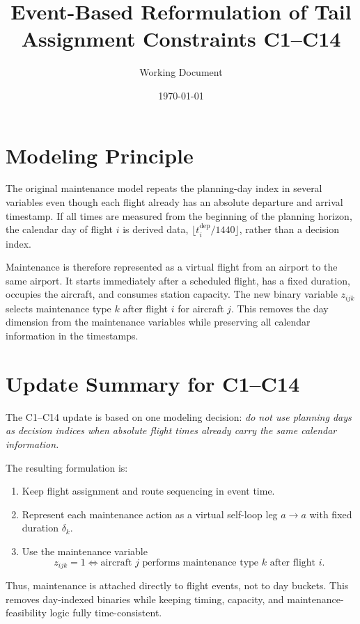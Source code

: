 \documentclass[11pt,a4paper]{article}
\title{Event-Based Reformulation of Tail Assignment Constraints C1--C14}
\author{Working Document}
\date{\today}
\begin{document}
\maketitle

\section{Modeling Principle}

The original maintenance model repeats the planning-day index in several
variables even though each flight already has an absolute departure and
arrival timestamp. If all times are measured from the beginning of the
planning horizon, the calendar day of flight $i$ is derived data,
$\lfloor t_i^{\mathrm{dep}}/1440\rfloor$, rather than a decision index.

Maintenance is therefore represented as a virtual flight from an airport to
the same airport. It starts immediately after a scheduled flight, has a fixed
duration, occupies the aircraft, and consumes station capacity. The new binary
variable $z_{ijk}$ selects maintenance type $k$ after flight $i$ for aircraft
$j$. This removes the day dimension from the maintenance variables while
preserving all calendar information in the timestamps.

\section{Update Summary for C1--C14}

The C1--C14 update is based on one modeling decision:
\emph{do not use planning days as decision indices when absolute flight times
already carry the same calendar information.}

The resulting formulation is:

\begin{enumerate}
  \item Keep flight assignment and route sequencing in event time.
  \item Represent each maintenance action as a virtual self-loop leg
  $a\rightarrow a$ with fixed duration $\delta_k$.
  \item Use the maintenance variable
  \[
    z_{ijk}=1
    \iff
    \text{aircraft }j\text{ performs maintenance type }k\text{ after flight }i.
  \]
\end{enumerate}

Thus, maintenance is attached directly to flight events, not to day buckets.
This removes day-indexed binaries while keeping timing, capacity, and
maintenance-feasibility logic fully time-consistent.
\end{document}
